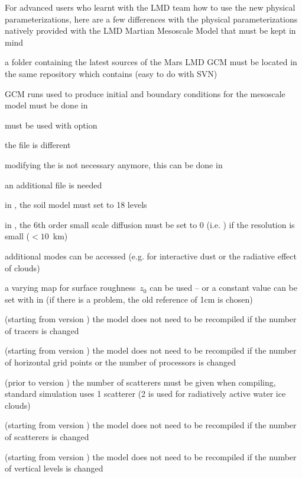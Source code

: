 \sk
For advanced users who learnt with the LMD team how to use the new physical parameterizations, here are a few differences with the physical parameterizations natively provided with the LMD Martian Mesoscale Model that must be kept in mind
\begin{finger}
\item a folder  containing the latest sources of the Mars LMD GCM must be located in the same repository which contains  (easy to do with SVN)
\item GCM runs used to produce initial and boundary conditions for the mesoscale model must be done in 
\item {} must be used with option 
\item the  file is different
\item modifying the  is not necessary anymore, this can be done in 
\item an additional  file is needed
\item in , the soil model must set to 18 levels
\item in , the 6th order small scale diffusion must be set to 0 (i.e. ) if the resolution is small ($<10$~km)
\item additional  modes can be accessed (e.g. for interactive dust or the radiative effect of clouds)
\item a varying map for surface roughness~$z_0$ can be used -- or a constant value can be set with  in  (if there is a problem, the old reference of 1cm is chosen)
\item (starting from version ) the model does not need to be recompiled if the number of tracers is changed
\item (starting from version ) the model does not need to be recompiled if the number of horizontal grid points or the number of processors is changed
\item (prior to version ) the number of scatterers must be given when compiling, standard simulation uses 1 scatterer (2 is used for radiatively active water ice clouds)
\item (starting from version ) the model does not need to be recompiled if the number of scatterers is changed
\item (starting from version ) the model does not need to be recompiled if the number of vertical levels is changed
\end{finger}

